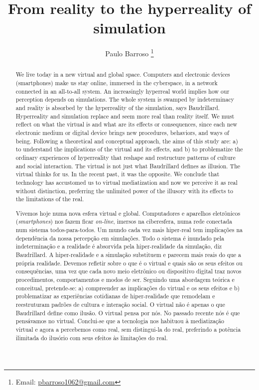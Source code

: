 \documentclass[english]{textolivre}
\title{From reality to the hyperreality of simulation}
\author[1]{Paulo Barroso \orcid{0000-0001-7638-5064} \thanks{Email: \url{pbarroso1062@gmail.com}}}
\affil[1]{Instituto Politécnico de Viseu, Escola Superior de Educação,
Departamento de Comunicação e Arte, Viseu, Portugal.}
\begin{document}
\maketitle

\begin{polyabstract}
\begin{abstract}
We live today in a new virtual and global space. Computers and electronic devices (smartphones) make us stay online, immersed in the cyberspace, in a network connected in an all-to-all system. An increasingly hyperreal world implies how our perception depends on simulations. The whole system is swamped by indeterminacy and reality is absorbed by the hyperreality of the simulation, says Baudrillard. Hyperreality and simulation replace and seem more real than reality itself. We must reflect on what the virtual is and what are its effects or consequences, since each new electronic medium or digital device brings new procedures, behaviors, and ways of being. Following a theoretical and conceptual approach, the aims of this study are: a) to understand the implications of the virtual and its effects, and b) to problematize the ordinary experiences of hyperreality that reshape and restructure patterns of culture and social interaction. The virtual is not just what Baudrillard defines as illusion. The virtual thinks for us. In the recent past, it was the opposite. We conclude that technology has accustomed us to virtual mediatization and now we perceive it as real without distinction, preferring the unlimited power of the illusory with its effects to the limitations of the real.

\end{abstract}

\begin{portuguese}
\begin{abstract}
Vivemos hoje numa nova esfera virtual e global. Computadores e aparelhos eletrônicos (\textit{smartphones}) nos fazem ficar \textit{on-line}, imersos na ciberesfera, numa rede conectada num sistema todos-para-todos. Um mundo cada vez mais hiper-real tem implicações na dependência da nossa percepção em simulações. Todo o sistema é inundado pela indeterminação e a realidade é absorvida pela hiper-realidade da simulação, diz Baudrillard. A hiper-realidade e a simulação substituem e parecem mais reais do que a própria realidade. Devemos refletir sobre o que é o virtual e quais são os seus efeitos ou consequências, uma vez que cada novo meio eletrônico ou dispositivo digital traz novos procedimentos, comportamentos e modos de ser. Seguindo uma abordagem teórica e conceitual, pretende-se: a) compreender as implicações do virtual e os seus efeitos e b) problematizar as experiências cotidianas de hiper-realidade que remodelam e reestruturam padrões de cultura e interação social. O virtual não é apenas o que Baudrillard define como ilusão. O virtual pensa por nós. No passado recente nós é que pensávamos no virtual. Conclui-se que a tecnologia nos habituou à mediatização virtual e agora a percebemos como real, sem distingui-la do real, preferindo a potência ilimitada do ilusório com seus efeitos às limitações do real.


\end{abstract}
\end{portuguese}
\end{polyabstract}
\end{document}
